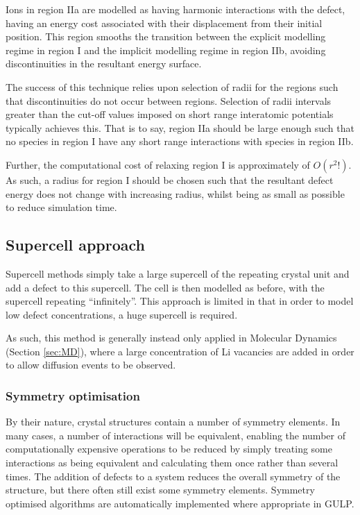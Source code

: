 Ions in region IIa are modelled as having harmonic interactions with the defect, having an energy cost associated with their displacement from their initial position.
This region smooths the transition between the explicit modelling regime in region I and the implicit modelling regime in region IIb, avoiding discontinuities in the resultant energy surface.

The success of this technique relies upon selection of radii for the regions such that discontinuities do not occur between regions.
Selection of radii intervals greater than the cut-off values imposed on short range interatomic potentials typically achieves this.
That is to say, region IIa should be large enough such that no species in region I have any short range interactions with species in region IIb.

Further, the computational cost of relaxing region I is approximately of {\color{red}$O(r^2!)$}.
As such, a radius for region I should be chosen such that the resultant defect energy does not change with increasing radius, whilst being as small as possible to reduce simulation time.

\subsection{Supercell approach}  
Supercell methods simply take a large supercell of the repeating crystal unit and add a defect to this supercell.
The cell is then modelled as before, with the supercell repeating ``infinitely''.
This approach is limited in that in order to model low defect concentrations, a huge supercell is required.

As such, this method is generally instead only applied in Molecular Dynamics (Section \ref{sec:MD}), where a large concentration of Li vacancies are added in order to allow diffusion events to be observed.

\subsubsection{{\color{red}Symmetry optimisation}} %
By their nature, crystal structures contain a number of symmetry elements.
In many cases, a number of interactions will be equivalent, enabling the number of computationally expensive operations to be reduced by simply treating some interactions as being equivalent and calculating them once rather than several times.
The addition of defects to a system reduces the overall symmetry of the structure, but there often still exist some symmetry elements.
Symmetry optimised algorithms are automatically implemented where appropriate in GULP.


